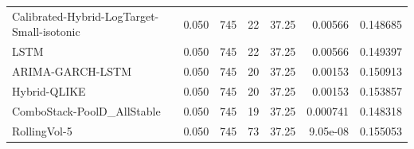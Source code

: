 \begin{table}[!t]
\begin{tabular}{@{}lrrrrrr@{}}
Calibrated-Hybrid-LogTarget-Small-isotonic & 0.050 & 745 & 22 & 37.25 & 0.00566 & 0.148685 \\
LSTM & 0.050 & 745 & 22 & 37.25 & 0.00566 & 0.149397 \\
ARIMA-GARCH-LSTM & 0.050 & 745 & 20 & 37.25 & 0.00153 & 0.150913 \\
Hybrid-QLIKE & 0.050 & 745 & 20 & 37.25 & 0.00153 & 0.153857 \\
ComboStack-PoolD\_AllStable & 0.050 & 745 & 19 & 37.25 & 0.000741 & 0.148318 \\
RollingVol-5 & 0.050 & 745 & 73 & 37.25 & 9.05e-08 & 0.155053 \\
\bottomrule
\end{tabular}
\end{table}
